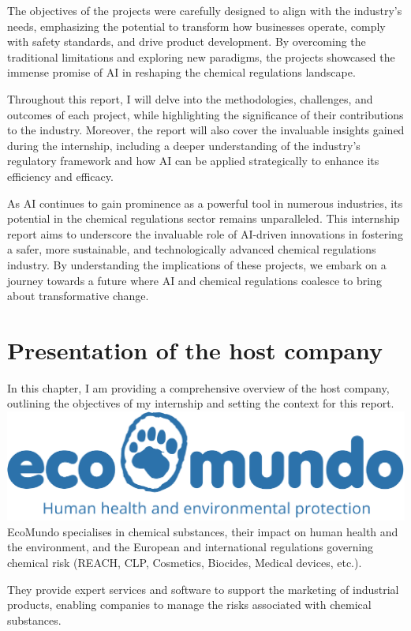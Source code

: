 \documentclass[a4paper,12pt,twoside]{report}
\begin{document}
The objectives of the projects were carefully designed to align with the industry's needs, emphasizing the potential to transform how businesses operate, comply with safety standards, and drive product development. By overcoming the traditional limitations and exploring new paradigms, the projects showcased the immense promise of AI in reshaping the chemical regulations landscape.

Throughout this report, I will delve into the methodologies, challenges, and outcomes of each project, while highlighting the significance of their contributions to the industry. Moreover, the report will also cover the invaluable insights gained during the internship, including a deeper understanding of the industry's regulatory framework and how AI can be applied strategically to enhance its efficiency and efficacy.

As AI continues to gain prominence as a powerful tool in numerous industries, its potential in the chemical regulations sector remains unparalleled. This internship report aims to underscore the invaluable role of AI-driven innovations in fostering a safer, more sustainable, and technologically advanced chemical regulations industry. By understanding the implications of these projects, we embark on a journey towards a future where AI and chemical regulations coalesce to bring about transformative change.

\section{Presentation of the host company}
In this chapter, I am providing a comprehensive overview of the host company, outlining the objectives of my internship and setting the context for this report.
\includegraphics[width=\textwidth]{images/ecomundo}
EcoMundo \cite{ecomundo} specialises in chemical substances, their impact on human health and the environment, and the European and international regulations governing chemical risk (REACH, CLP, Cosmetics, Biocides, Medical devices, etc.).

They provide expert services and software to support the marketing of industrial products, enabling companies to manage the risks associated with chemical substances.
\end{document}
